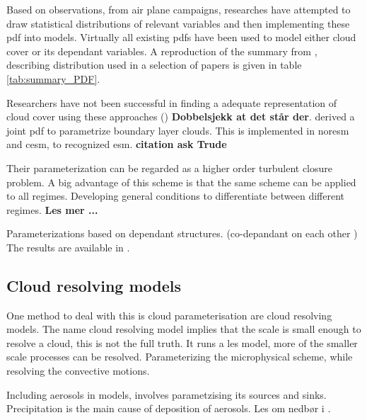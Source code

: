 Based on observations, from air plane campaigns, researches have attempted to draw statistical distributions of relevant variables and then implementing these \acrshort{pdf} into models. Virtually all existing \acrshort{pdf}s have been used to model either cloud cover or its dependant variables. %
A reproduction of the summary from \cite{Tompkins2009CloudParametrization}, describing distribution used in a selection of papers is given in table \ref{tab:summary_PDF}.


Researchers have not been successful in finding a adequate representation of cloud cover using these approaches (\cite{Tompkins2009CloudParametrization}) \textbf{Dobbelsjekk at det står der}. \cite{Golaz2002_part1} derived a joint \acrshort{pdf} to parametrize boundary layer clouds. This is implemented in \acrfull{noresm} and \acrfull{cesm}, to recognized \acrshort{esm}. \textbf{citation ask Trude} 

Their parameterization can be regarded as a higher order turbulent closure problem. A big advantage of this scheme is that the same scheme can be applied to all regimes. Developing general conditions to differentiate between different regimes. \textbf{Les mer ...}

Parameterizations based on dependant structures. (co-depandant on each other ) The results are available in \cite{Golaz2002_part2}.



\subsection{Cloud resolving models} \label{sec:params_climate_models}
\cite{raso}
One method to deal with this is cloud parameterisation are cloud resolving models. The name cloud resolving model implies that the scale is small enough to resolve a cloud, this is not the full truth. It runs a \acrlong{les} model, more of the smaller scale processes can be resolved. Parameterizing the microphysical scheme, while resolving the convective motions.

Including aerosols in models, involves parametzising its sources and sinks. Precipitation is the main cause of deposition of aerosols. Les om nedbør i \cite{Simmons2016Observation2016-2025}. 


